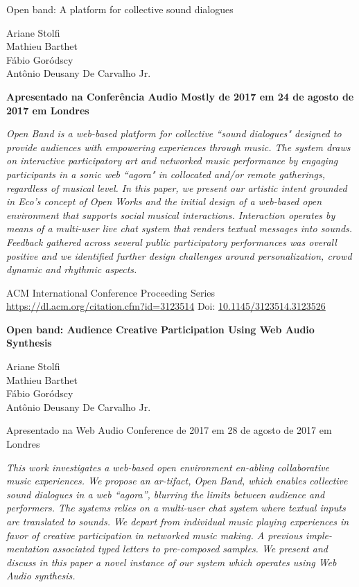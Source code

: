 Open band: A platform for collective sound dialogues

Ariane Stolfi\\
Mathieu Barthet\\
Fábio Goródscy\\
Antônio Deusany De Carvalho Jr.

\textbf{Apresentado na Conferência Audio Mostly de 2017 em 24 de agosto de 2017 em Londres}

\textit{Open Band is a web-based platform for collective “sound dialogues" designed to provide audiences with empowering experiences through music. The system draws on interactive participatory art and networked music performance by engaging participants in a sonic web “agora" in collocated and/or remote gatherings, regardless of musical level. In this paper, we present our artistic intent grounded in Eco's concept of Open Works and the initial design of a web-based open environment that supports social musical interactions. Interaction operates by means of a multi-user live chat system that renders textual messages into sounds. Feedback gathered across several public participatory performances was overall positive and we identified further design challenges around personalization, crowd dynamic and rhythmic aspects.}

ACM International Conference Proceeding Series
\url{https://dl.acm.org/citation.cfm?id=3123514}
Doi: \url{10.1145/3123514.3123526} 


\textbf{Open band: Audience Creative Participation Using Web Audio Synthesis}

Ariane Stolfi\\
Mathieu Barthet\\
Fábio Goródscy\\
Antônio Deusany De Carvalho Jr.

Apresentado na Web Audio Conference de 2017 em 28 de agosto de 2017 em Londres

\textit{This work investigates a web-based open environment en-abling collaborative music experiences. We propose an ar-tifact, Open Band, which enables collective sound dialogues in a web ``agora'', blurring the limits between audience and performers. The systems relies on a multi-user chat system where textual inputs are translated to sounds. We depart from individual music playing experiences in favor of creative participation in networked music making. A previous imple-mentation associated typed letters to pre-composed samples. We present and discuss in this paper a novel instance of our system which operates using Web Audio synthesis.}


